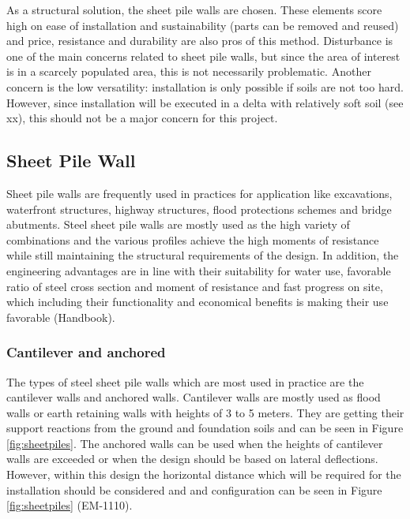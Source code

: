 As a structural solution, the sheet pile walls are chosen. These elements score high on ease of installation and sustainability (parts can be removed and reused) and price, resistance and durability are also pros of this method. Disturbance is one of the main concerns related to sheet pile walls, but since the area of interest is in a scarcely populated area, this is not necessarily problematic. Another concern is the low versatility: installation is only possible if soils are not too hard. However, since installation will be executed in a delta with relatively soft soil (see xx), this should not be a major concern for this project.

\subsection{Sheet Pile Wall}
\label{section:sheet_pile_wall}

Sheet pile walls are frequently used in practices for application like excavations, waterfront structures, highway structures, flood protections schemes and bridge abutments. Steel sheet pile walls are mostly used as the high variety of combinations and the various profiles achieve the high moments of resistance while still maintaining the structural requirements of the design. In addition, the engineering advantages are in line with their suitability for water use, favorable ratio of steel cross section and moment of resistance and fast progress on site, which including their functionality and economical benefits is making their use favorable (Handbook).

\subsubsection{Cantilever and anchored}

The types of steel sheet pile walls which are most used in practice are the cantilever walls and anchored walls. Cantilever walls are mostly used as flood walls or earth retaining walls with heights of 3 to 5 meters. They are getting their support reactions from the ground and foundation soils and can be seen in Figure \ref{fig:sheetpiles}. The anchored walls can be used when the heights of cantilever walls are exceeded or when the design should be based on lateral deflections. However, within this design the horizontal distance which will be required for the installation should be considered and and configuration can be seen in Figure \ref{fig:sheetpiles} (EM-1110).


